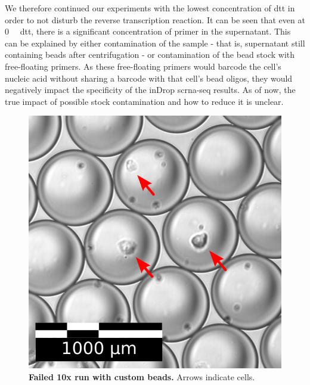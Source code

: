 We therefore continued our experiments with the lowest concentration of \acrshort{dtt} in order to not disturb the reverse transcription reaction. It can be seen that even at \SI{0}{\milli\molar} \acrshort{dtt}, there is a significant concentration of primer in the supernatant. This can be explained by either contamination of the sample - that is, supernatant still containing beads after centrifugation - or contamination of the bead stock with free-floating primers. As these free-floating primers would barcode the cell's nucleic acid without sharing a barcode with that cell's bead oligos, they would negatively impact the specificity of the inDrop \acrshort{scrna-seq} results. As of now, the true impact of possible stock contamination and how to reduce it is unclear.\pms

\begin{figure}
\vspace{-10pt}
\centering
\includegraphics[width=\textwidth/3]{./ims/indrop_failed10x_2.png}
\caption[Failed 10x run with custom beads]{\textbf{Failed 10x run with custom beads.} Arrows indicate cells.}
\label{fig:indrop_failed10x}
\vspace{10pt}
\end{figure}

